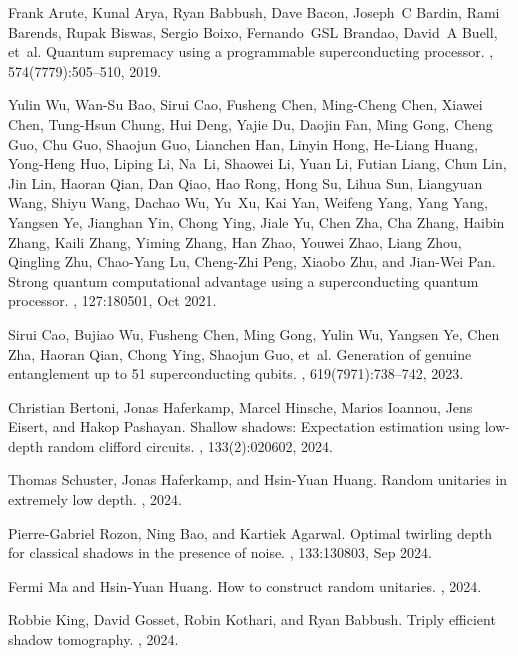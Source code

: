 \documentclass[showpacs,onecolumn,aps,prx,long bibliography,superscriptaddress,notitlepage]{revtex4-1}
\begin{document}
\begin{thebibliography}{10}
Frank Arute, Kunal Arya, Ryan Babbush, Dave Bacon, Joseph~C Bardin, Rami
  Barends, Rupak Biswas, Sergio Boixo, Fernando~GSL Brandao, David~A Buell,
  et~al.
\newblock Quantum supremacy using a programmable superconducting processor.
, 574(7779):505--510, 2019.

Yulin Wu, Wan-Su Bao, Sirui Cao, Fusheng Chen, Ming-Cheng Chen, Xiawei Chen,
  Tung-Hsun Chung, Hui Deng, Yajie Du, Daojin Fan, Ming Gong, Cheng Guo, Chu
  Guo, Shaojun Guo, Lianchen Han, Linyin Hong, He-Liang Huang, Yong-Heng Huo,
  Liping Li, Na~Li, Shaowei Li, Yuan Li, Futian Liang, Chun Lin, Jin Lin,
  Haoran Qian, Dan Qiao, Hao Rong, Hong Su, Lihua Sun, Liangyuan Wang, Shiyu
  Wang, Dachao Wu, Yu~Xu, Kai Yan, Weifeng Yang, Yang Yang, Yangsen Ye,
  Jianghan Yin, Chong Ying, Jiale Yu, Chen Zha, Cha Zhang, Haibin Zhang, Kaili
  Zhang, Yiming Zhang, Han Zhao, Youwei Zhao, Liang Zhou, Qingling Zhu,
  Chao-Yang Lu, Cheng-Zhi Peng, Xiaobo Zhu, and Jian-Wei Pan.
\newblock Strong quantum computational advantage using a superconducting
  quantum processor.
, 127:180501, Oct 2021.

Sirui Cao, Bujiao Wu, Fusheng Chen, Ming Gong, Yulin Wu, Yangsen Ye, Chen Zha,
  Haoran Qian, Chong Ying, Shaojun Guo, et~al.
\newblock Generation of genuine entanglement up to 51 superconducting qubits.
, 619(7971):738--742, 2023.

Christian Bertoni, Jonas Haferkamp, Marcel Hinsche, Marios Ioannou, Jens
  Eisert, and Hakop Pashayan.
\newblock Shallow shadows: Expectation estimation using low-depth random
  clifford circuits.
, 133(2):020602, 2024.

Thomas Schuster, Jonas Haferkamp, and Hsin-Yuan Huang.
\newblock Random unitaries in extremely low depth.
, 2024.

Pierre-Gabriel Rozon, Ning Bao, and Kartiek Agarwal.
\newblock Optimal twirling depth for classical shadows in the presence of
  noise.
, 133:130803, Sep 2024.

Fermi Ma and Hsin-Yuan Huang.
\newblock How to construct random unitaries.
, 2024.

Robbie King, David Gosset, Robin Kothari, and Ryan Babbush.
\newblock Triply efficient shadow tomography.
, 2024.


\end{thebibliography}
\end{document}
